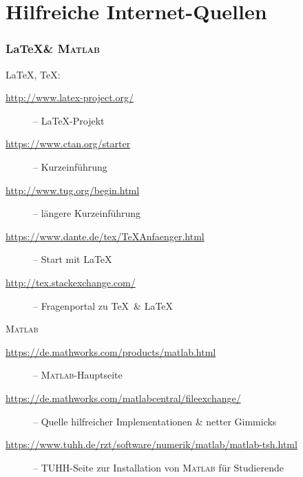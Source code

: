\documentclass[10pt]{beamer} %
\begin{document}
\section{Hilfreiche Internet-Quellen}
\begin{frame}
  \frametitle{\LaTeX \& \textsc{Matlab}}

  \LaTeX, \TeX:
  \begin{description}
  \item[\href{http://www.latex-project.org/}%
             {http://www.latex-project.org/}] -- \LaTeX-Projekt
  \item[\href{https://www.ctan.org/starter}%
             {https://www.ctan.org/starter}] -- Kurzeinführung
  \item[\href{http://www.tug.org/begin.html}%
             {http://www.tug.org/begin.html}] -- längere
             Kurzeinführung
  \item[\href{https://www.dante.de/tex/TeXAnfaenger.html}%
             {https://www.dante.de/tex/TeXAnfaenger.html}] -- Start
             mit \LaTeX
  \item[\href{http://tex.stackexchange.com/}%
             {http://tex.stackexchange.com/}] -- Fragenportal zu \TeX\
             \& \LaTeX
  \end{description}

  \vspace*{1em}

  \textsc{Matlab}
  \begin{description}
  \item[\href{https://de.mathworks.com/products/matlab.html}%
             {https://de.mathworks.com/products/matlab.html}] --
             \textsc{Matlab}-Hauptseite
  \item[\href{https://de.mathworks.com/matlabcentral/fileexchange/}%
             {https://de.mathworks.com/matlabcentral/fileexchange/}]
             -- Quelle hilfreicher Implementationen \& netter Gimmicks
  \item[\href{https://www.tuhh.de/rzt/software/numerik/matlab/matlab-tsh.html}%
             {https://www.tuhh.de/rzt/software/numerik/matlab/matlab-tsh.html}]
             -- TUHH-Seite zur Installation von \textsc{Matlab} für
             Studierende
  \end{description}

\end{frame}
\end{document}
